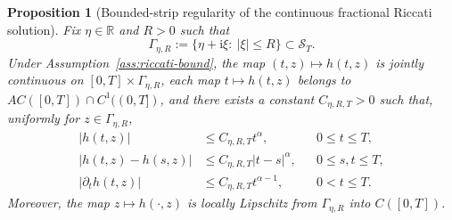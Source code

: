\documentclass[letterpaper]{article}
\numberwithin{equation}{section}
\newtheorem{proposition}[theorem]{Proposition}
\theoremstyle{definition}
\theoremstyle{remark}
\newcommand{\R}{\mathbb{R}}
\newcommand{\ii}{\mathrm{i}}
\begin{document}
\begin{proposition}[Bounded-strip regularity of the continuous fractional Riccati solution]
\label{prop:riccati-regularity}
Fix $\eta\in\R$ and $R>0$ such that
\[
  \Gamma_{\eta,R}:=\{\eta+\ii\xi:\ |\xi|\le R\}\subset \mathcal S_T.
\]
Under Assumption~\ref{ass:riccati-bound}, the map $(t,z)\mapsto h(t,z)$ is
jointly continuous on $[0,T]\times\Gamma_{\eta,R}$, each map
$t\mapsto h(t,z)$ belongs to $AC([0,T])\cap C^1((0,T])$, and there exists a
constant $C_{\eta,R,T}>0$ such that, uniformly for $z\in\Gamma_{\eta,R}$,
\begin{align}
  |h(t,z)| &\le C_{\eta,R,T}t^\alpha,
  &&0\le t\le T,\label{eq:h-small-t-prop}\\
  |h(t,z)-h(s,z)| &\le C_{\eta,R,T}|t-s|^\alpha,
  &&0\le s,t\le T,\label{eq:h-holder-t-prop}\\
  |\partial_t h(t,z)| &\le C_{\eta,R,T}t^{\alpha-1},
  &&0<t\le T.\label{eq:h-derivative-t-prop}
\end{align}
Moreover, the map $z\mapsto h(\cdot,z)$ is locally Lipschitz from
$\Gamma_{\eta,R}$ into $C([0,T])$.
\end{proposition}
\end{document}
